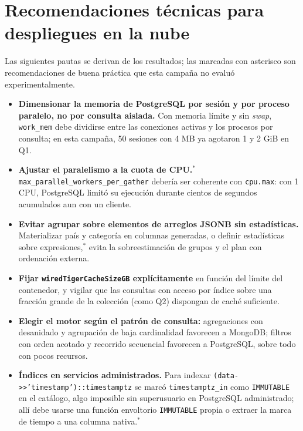 \documentclass[12pt,letterpaper]{article}
\newcommand{\code}[1]{\texttt{#1}}
\newcommand{\Mongo}{MongoDB}
\newcommand{\PG}{PostgreSQL}
\begin{document}
\section{Recomendaciones técnicas para despliegues en la nube}
Las siguientes pautas se derivan de los resultados; las marcadas con asterisco son recomendaciones de buena práctica que esta campaña no evaluó experimentalmente.
\begin{itemize}
\item \textbf{Dimensionar la memoria de \PG{} por sesión y por proceso paralelo, no por consulta aislada.} Con memoria límite y sin \textit{swap}, \code{work\_mem} debe dividirse entre las conexiones activas y los procesos por consulta; en esta campaña, 50 sesiones con 4 MB ya agotaron 1 y 2 GiB en Q1.
\item \textbf{Ajustar el paralelismo a la cuota de CPU.}$^{*}$ \code{max\_parallel\_workers\_per\_gather} debería ser coherente con \code{cpu.max}: con 1 CPU, \PG{} limitó su ejecución durante cientos de segundos acumulados aun con un cliente.
\item \textbf{Evitar agrupar sobre elementos de arreglos JSONB sin estadísticas.} Materializar país y categoría en columnas generadas, o definir estadísticas sobre expresiones,$^{*}$ evita la sobreestimación de  grupos y el plan con ordenación externa.
\item \textbf{Fijar \code{wiredTigerCacheSizeGB} explícitamente} en función del límite del contenedor, y vigilar que las consultas con acceso por índice sobre una fracción grande de la colección (como Q2) dispongan de caché suficiente.
\item \textbf{Elegir el motor según el patrón de consulta:} agregaciones con desanidado y agrupación de baja cardinalidad favorecen a \Mongo{}; filtros con orden acotado y recorrido secuencial favorecen a \PG{}, sobre todo con pocos recursos.
\item \textbf{Índices en servicios administrados.} Para indexar \code{(data->{}>'timestamp')::timestamptz} se marcó \code{timestamptz\_in} como \code{IMMUTABLE} en el catálogo, algo imposible sin superusuario en \PG{} administrado; allí debe usarse una función envoltorio \code{IMMUTABLE} propia o extraer la marca de tiempo a una columna nativa.$^{*}$
\end{itemize}
\end{document}

